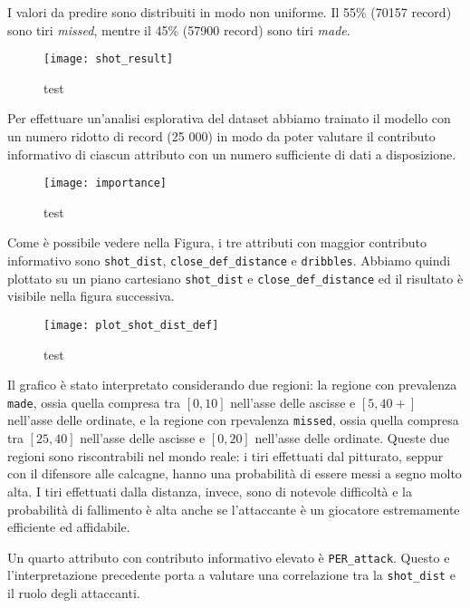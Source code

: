 \par
I valori da predire sono distribuiti in modo non uniforme. Il 55\% (70157 record) sono tiri \textit{missed}, mentre il 45\% (57900 record) sono tiri \textit{made}.

\begin{figure}
\caption{test}
\fontsize{9pt}{1em}
	\texttt{[image: shot\_result]}
\end{figure}

\par
Per effettuare un'analisi esplorativa del dataset abbiamo trainato il modello con un numero ridotto di record (25 000) in modo da poter valutare il contributo informativo di ciascun attributo con un numero sufficiente di dati a disposizione.

\begin{figure}
\caption{test}
\fontsize{9pt}{1em}
	\texttt{[image: importance]}
\end{figure}

\par
Come è possibile vedere nella Figura, i tre attributi con maggior contributo informativo sono \texttt{shot\_dist}, \texttt{close\_def\_distance} e \texttt{dribbles}. Abbiamo quindi plottato su un piano cartesiano \texttt{shot\_dist} e \texttt{close\_def\_distance} ed il risultato è visibile nella figura successiva.

\begin{figure}
\caption{test}
\fontsize{9pt}{1em}
	\texttt{[image: plot\_shot\_dist\_def]}
\end{figure}

Il grafico è stato interpretato considerando due regioni: la regione con prevalenza \texttt{made}, ossia quella compresa tra $[0, 10]$ nell'asse delle ascisse e $[5, 40+] $ nell'asse delle ordinate, e la regione con rpevalenza \texttt{missed}, ossia quella compresa tra $[25, 40]$ nell'asse delle ascisse e $[0, 20] $ nell'asse delle ordinate.
Queste due regioni sono riscontrabili nel mondo reale: i tiri effettuati dal pitturato, seppur con il difensore alle calcagne, hanno una probabilità di essere messi a segno molto alta. I tiri effettuati dalla distanza, invece, sono di notevole difficoltà e la probabilità di fallimento è alta anche se l'attaccante è un giocatore estremamente efficiente ed affidabile.

\par
Un quarto attributo con contributo informativo elevato è \texttt{PER\_attack}. Questo e l'interpretazione precedente porta a valutare una correlazione tra la \texttt{shot\_dist} e il ruolo degli attaccanti.

